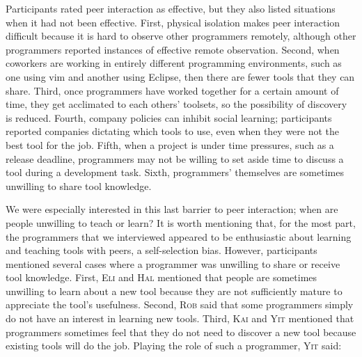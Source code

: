 \documentclass[smallextended]{svjour3}
\newcommand\discovery{peer interaction\xspace}
\newcommand{\subject}[1]{\textsc{#1}}
\newcommand{\bsub}{{\subject{Rob}}\xspace}
\newcommand{\csub}{{\subject{Eli}}\xspace}
\newcommand{\jsub}{{\subject{Yit}}\xspace}
\newcommand{\lsub}{{\subject{Kai}}\xspace}
\newcommand{\psub}{{\subject{Hal}}\xspace}
\begin{document}
\noindent
Participants rated \discovery as effective, but they
also listed situations when it had not been effective.
First, physical isolation makes \discovery difficult because it is
hard to observe other programmers remotely, although other programmers
reported instances of effective remote observation.
Second, when coworkers are working in entirely different programming
environments, such as one using vim and another using Eclipse, then
there are fewer tools that they can share.
Third, once programmers have worked together for a certain amount of time,
they get acclimated to each others' toolsets, so the possibility of discovery
is reduced.
Fourth, company policies can inhibit social learning; participants reported
companies dictating which tools to use, even when they were not the best tool
for the job.
Fifth, when a project is under time pressures, such as a release deadline,
programmers may not be willing to set aside time to discuss a tool during a
development task.
Sixth, programmers' themselves are sometimes unwilling to share tool knowledge. 

We were especially interested in this last barrier
to \discovery; when are people unwilling to teach or learn?
It is worth mentioning that, for the most part, the programmers that we
interviewed appeared to be enthusiastic about learning and teaching tools with
peers, a self-selection bias.
However, participants mentioned several cases where a programmer was unwilling to
share or receive tool knowledge.
First, \csub and \psub mentioned that people are sometimes unwilling to learn
about a new tool because they are not sufficiently mature to appreciate the
tool's usefulness.
Second, \bsub said that some programmers simply do not have an interest in
learning new tools.
Third, \lsub and \jsub mentioned that programmers sometimes feel that they do
not need to discover a new tool because existing tools will do the job.
Playing the role of such a programmer, \jsub said:
\end{document}
